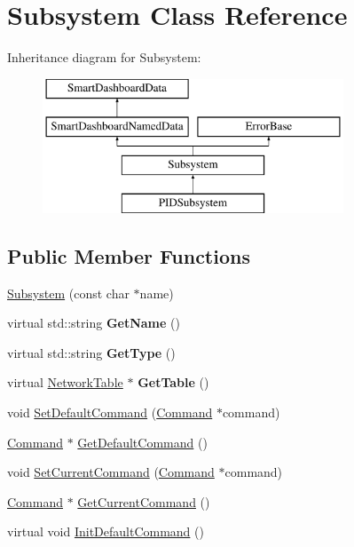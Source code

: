 \hypertarget{classSubsystem}{
\section{Subsystem Class Reference}
\label{classSubsystem}
}
Inheritance diagram for Subsystem:\begin{figure}[H]
\begin{center}
\leavevmode
\includegraphics[height=4.000000cm]{classSubsystem}
\end{center}
\end{figure}
\subsection*{Public Member Functions}
\begin{DoxyCompactItemize}
\item 
\hyperlink{classSubsystem_ad2df571da0438beacb3c1800c0316477}{Subsystem} (const char $\ast$name)
\item 
\hypertarget{classSubsystem_a1a571943173d3bc47317fc50deab4e13}{
virtual std::string {\bfseries GetName} ()}
\label{classSubsystem_a1a571943173d3bc47317fc50deab4e13}

\item 
\hypertarget{classSubsystem_a75dbfe31d014bf2773cf72ae23594ec6}{
virtual std::string {\bfseries GetType} ()}
\label{classSubsystem_a75dbfe31d014bf2773cf72ae23594ec6}

\item 
\hypertarget{classSubsystem_ac1291a98c0e8dd5602e39a8e98704aa6}{
virtual \hyperlink{classNetworkTable}{NetworkTable} $\ast$ {\bfseries GetTable} ()}
\label{classSubsystem_ac1291a98c0e8dd5602e39a8e98704aa6}

\item 
void \hyperlink{classSubsystem_aeb73b1829ac913e95035064d1b46c6f2}{SetDefaultCommand} (\hyperlink{classCommand}{Command} $\ast$command)
\item 
\hyperlink{classCommand}{Command} $\ast$ \hyperlink{classSubsystem_a50f7f4a6bb9befcd222e629b0c2c18b7}{GetDefaultCommand} ()
\item 
void \hyperlink{classSubsystem_a5caed10655c42424ef731c2a12681d9a}{SetCurrentCommand} (\hyperlink{classCommand}{Command} $\ast$command)
\item 
\hyperlink{classCommand}{Command} $\ast$ \hyperlink{classSubsystem_a3acb9f816199df44fd1dc5f452a2a6c8}{GetCurrentCommand} ()
\item 
virtual void \hyperlink{classSubsystem_a3e459cd7c50c21fad4dfa640b8b5bf65}{InitDefaultCommand} ()
\end{DoxyCompactItemize}
